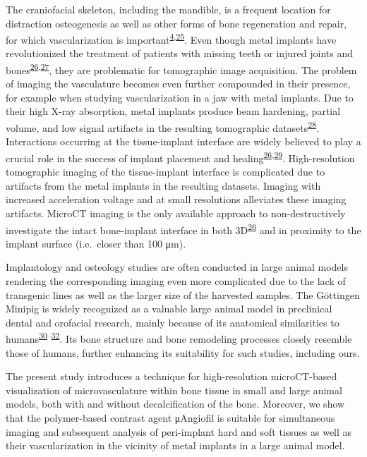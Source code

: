 The craniofacial skeleton, including the mandible, is a frequent location for distraction osteogenesis as well as other forms of bone regeneration and repair, for which vascularization is important\textsuperscript{\protect\hyperlink{ref-yZTJBX1B}{4},\protect\hyperlink{ref-18wESlA6d}{25}}.
Even though metal implants have revolutionized the treatment of patients with missing teeth or injured joints and bones\textsuperscript{\protect\hyperlink{ref-11349lK8v}{26},\protect\hyperlink{ref-rCXuqa0O}{27}}, they are problematic for tomographic image acquisition.
The problem of imaging the vasculature becomes even further compounded in their presence, for example when studying vascularization in a jaw with metal implants.
Due to their high X-ray absorption, metal implants produce beam hardening, partial volume, and low signal artifacts in the resulting tomographic datasets\textsuperscript{\protect\hyperlink{ref-X5Wzek9s}{28}}.
Interactions occurring at the tissue-implant interface are widely believed to play a crucial role in the success of implant placement and healing\textsuperscript{\protect\hyperlink{ref-11349lK8v}{26},\protect\hyperlink{ref-137VU0bph}{29}}.
High-resolution tomographic imaging of the tissue-implant interface is complicated due to artifacts from the metal implants in the resulting datasets.
Imaging with increased acceleration voltage and at small resolutions alleviates these imaging artifacts.
MicroCT imaging is the only available approach to non-destructively investigate the intact bone-implant interface in both 3D\textsuperscript{\protect\hyperlink{ref-11349lK8v}{26}} and in proximity to the implant surface (i.e.~closer than 100 μm).

Implantology and osteology studies are often conducted in large animal models rendering the corresponding imaging even more complicated due to the lack of transgenic lines as well as the larger size of the harvested samples.
The Göttingen Minipig is widely recognized as a valuable large animal model in preclinical dental and orofacial research, mainly because of its anatomical similarities to humans\textsuperscript{\protect\hyperlink{ref-Siy9vGW7}{30}--\protect\hyperlink{ref-1EXdAADA3}{32}}.
Its bone structure and bone remodeling processes closely resemble those of humans, further enhancing its suitability for such studies, including ours.

The present study introduces a technique for high-resolution microCT-based visualization of microvasculature within bone tissue in small and large animal models, both with and without decalcification of the bone.
Moreover, we show that the polymer-based contrast agent μAngiofil is suitable for simultaneous imaging and subsequent analysis of peri-implant hard and soft tissues as well as their vascularization in the vicinity of metal implants in a large animal model.

